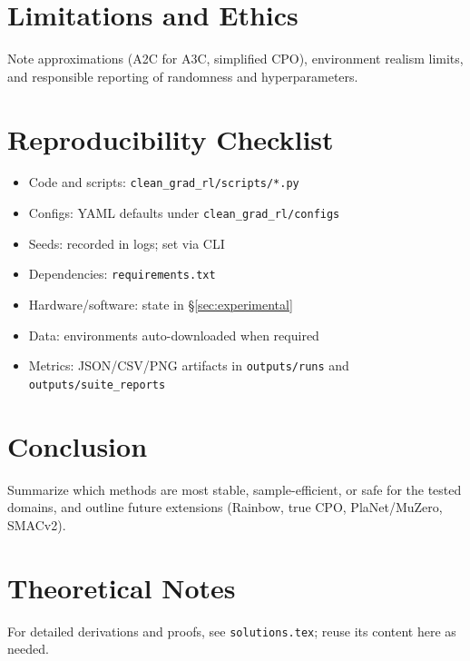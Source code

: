 \documentclass[12pt]{article}
\newcommand{\code}[1]{\texttt{#1}}
\begin{document}
\section{Limitations and Ethics}
Note approximations (A2C for A3C, simplified CPO), environment realism limits, and responsible reporting of randomness and hyperparameters.

\section{Reproducibility Checklist}
\begin{itemize}[leftmargin=*]
    \item Code and scripts: \code{clean\_grad\_rl/scripts/*.py}
    \item Configs: YAML defaults under \code{clean\_grad\_rl/configs}
    \item Seeds: recorded in logs; set via CLI
    \item Dependencies: \code{requirements.txt}
    \item Hardware/software: state in \S\ref{sec:experimental}
    \item Data: environments auto-downloaded when required
    \item Metrics: JSON/CSV/PNG artifacts in \code{outputs/runs} and \code{outputs/suite\_reports}
\end{itemize}

\section{Conclusion}
Summarize which methods are most stable, sample-efficient, or safe for the tested domains, and outline future extensions (Rainbow, true CPO, PlaNet/MuZero, SMACv2).




\appendix
\section{Theoretical Notes}
For detailed derivations and proofs, see \code{solutions.tex}; reuse its content here as needed.
\end{document}
